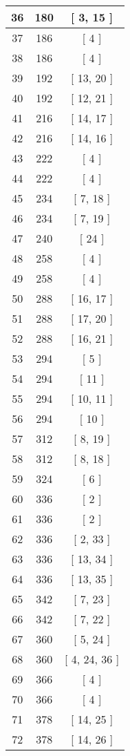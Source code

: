 \begin{center}
\begin{longtable}[H]{|| c c c ||}
\hline
36 & 180 & [ 3, 15 ] \\ 
\hline
37 & 186 & [ 4 ] \\ 
\hline
38 & 186 & [ 4 ] \\ 
\hline
39 & 192 & [ 13, 20 ] \\ 
\hline
40 & 192 & [ 12, 21 ] \\ 
\hline
41 & 216 & [ 14, 17 ] \\ 
\hline
42 & 216 & [ 14, 16 ] \\ 
\hline
43 & 222 & [ 4 ] \\ 
\hline
44 & 222 & [ 4 ] \\ 
\hline
45 & 234 & [ 7, 18 ] \\ 
\hline
46 & 234 & [ 7, 19 ] \\ 
\hline
47 & 240 & [ 24 ] \\ 
\hline
48 & 258 & [ 4 ] \\ 
\hline
49 & 258 & [ 4 ] \\ 
\hline
50 & 288 & [ 16, 17 ] \\ 
\hline
51 & 288 & [ 17, 20 ] \\ 
\hline
52 & 288 & [ 16, 21 ] \\ 
\hline
53 & 294 & [ 5 ] \\ 
\hline
54 & 294 & [ 11 ] \\ 
\hline
55 & 294 & [ 10, 11 ] \\ 
\hline
56 & 294 & [ 10 ] \\ 
\hline
57 & 312 & [ 8, 19 ] \\ 
\hline
58 & 312 & [ 8, 18 ] \\ 
\hline
59 & 324 & [ 6 ] \\ 
\hline
60 & 336 & [ 2 ] \\ 
\hline
61 & 336 & [ 2 ] \\ 
\hline
62 & 336 & [ 2, 33 ] \\ 
\hline
63 & 336 & [ 13, 34 ] \\ 
\hline
64 & 336 & [ 13, 35 ] \\ 
\hline
65 & 342 & [ 7, 23 ] \\ 
\hline
66 & 342 & [ 7, 22 ] \\ 
\hline
67 & 360 & [ 5, 24 ] \\ 
\hline
68 & 360 & [ 4, 24, 36 ] \\ 
\hline
69 & 366 & [ 4 ] \\ 
\hline
70 & 366 & [ 4 ] \\ 
\hline
71 & 378 & [ 14, 25 ] \\ 
\hline
72 & 378 & [ 14, 26 ] \\ 

\end{longtable}
\end{center}
